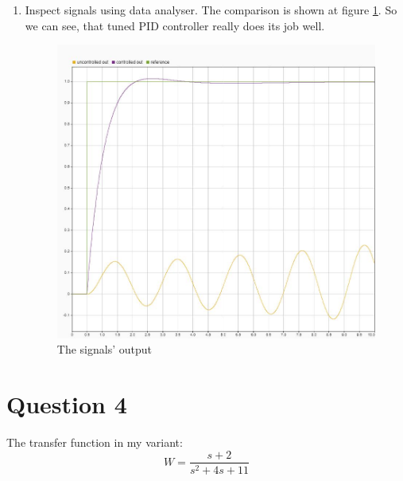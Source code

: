 \documentclass[12pt,letterpaper]{article}
\begin{document}
\begin{enumerate}[leftmargin=!,labelindent=5pt]
        \item Inspect signals using data analyser. The comparison is shown at figure \ref{fig:comparison_out}. So we can see, that tuned PID controller really does its job well.
        \begin{figure}[H]
            \centering
            \includegraphics[width=15cm]{images/output/comparison_graphs.jpg}
            \caption{The signals' output}
            \label{fig:comparison_out}
        \end{figure}
    \end{enumerate}
    
\section*{Question 4}
\label{Q:4}
    The transfer function in my variant:
    \begin{equation*}
        W = \frac{s + 2}{s^2 + 4s + 11}
    \end{equation*}
    
\end{document}
